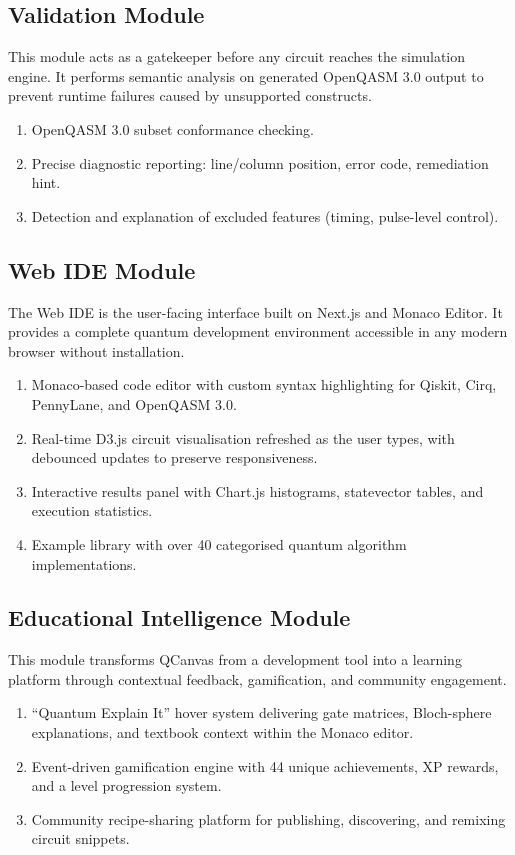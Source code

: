 \subsection{Validation Module}
This module acts as a gatekeeper before any circuit reaches the simulation engine. It performs semantic analysis on generated OpenQASM 3.0 output to prevent runtime failures caused by unsupported constructs.
\begin{enumerate}
    \item OpenQASM 3.0 subset conformance checking.
    \item Precise diagnostic reporting: line/column position, error code, remediation hint.
    \item Detection and explanation of excluded features (timing, pulse-level control).
\end{enumerate}

\subsection{Web IDE Module}
The Web IDE is the user-facing interface built on Next.js and Monaco Editor. It provides a complete quantum development environment accessible in any modern browser without installation.
\begin{enumerate}
    \item Monaco-based code editor with custom syntax highlighting for Qiskit, Cirq, PennyLane, and OpenQASM 3.0.
    \item Real-time D3.js circuit visualisation refreshed as the user types, with debounced updates to preserve responsiveness.
    \item Interactive results panel with Chart.js histograms, statevector tables, and execution statistics.
    \item Example library with over 40 categorised quantum algorithm implementations.
\end{enumerate}

\subsection{Educational Intelligence Module}
This module transforms QCanvas from a development tool into a learning platform through contextual feedback, gamification, and community engagement.
\begin{enumerate}
    \item ``Quantum Explain It'' hover system delivering gate matrices, Bloch-sphere explanations, and textbook context within the Monaco editor.
    \item Event-driven gamification engine with 44 unique achievements, XP rewards, and a level progression system.
    \item Community recipe-sharing platform for publishing, discovering, and remixing circuit snippets.
\end{enumerate}

